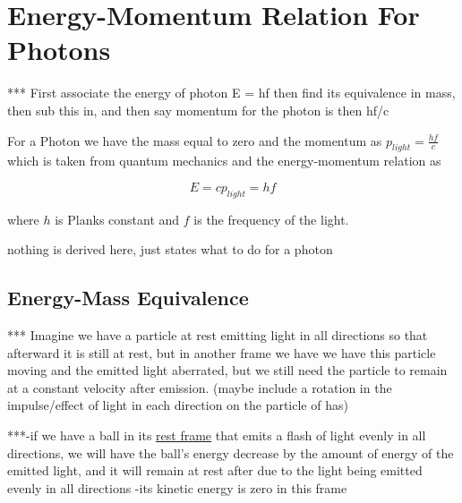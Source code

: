 \section{Energy-Momentum Relation For Photons} \label{sect: Energy-Momentum Relation For Photons}

*** First associate the energy of photon E = hf then find its equivalence in mass, then sub this in, and then say momentum for the photon is then hf/c

For a Photon we have the mass equal to zero and the momentum as $p_{light} = \frac{hf}{c}$ which is taken from quantum mechanics and the energy-momentum relation as

\begin{equation}
	E ={c}p_{light} = hf
\end{equation}

where ${h}$ is Planks constant and ${f}$ is the frequency of the light.

nothing is derived here, just states what to do for a photon

\subsection{Energy-Mass Equivalence} \label{subsect: Energy-Mass Equivalence}

*** Imagine we have a particle at rest emitting light in all directions so that afterward it is still at rest, but in another frame we have we have this particle moving and the emitted light aberrated, but we still need the particle to remain at a constant velocity after emission.
(maybe include a rotation in the impulse/effect of light in each direction on the particle of has)

***-if we have a ball in its \hyperlink{def-pr oper-frame}{rest frame} that emits a flash of light evenly in all directions, we will have the ball's energy decrease by the amount of energy of the emitted light, and it will remain at rest after due to the light being emitted evenly in all directions
-its kinetic energy is zero in this frame




